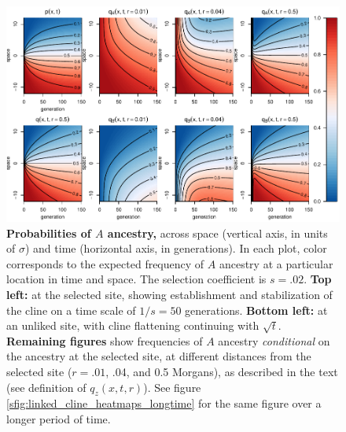 \documentclass[11pt,letterpaper]{article}
\begin{document}
\begin{figure}
    \includegraphics{figs/linked-frequencies.pdf}
    \caption{
        \textbf{Probabilities of $A$ ancestry,}
        across space (vertical axis, in units of $\sigma$) 
        and time (horizontal axis, in generations).
        In each plot, color corresponds to the expected frequency of $A$ ancestry
        at a particular location in time and space.
        The selection coefficient is $s=.02$.
        \textbf{Top left:} at the selected site, showing establishment and stabilization of the cline
        on a time scale of $1/s=50$ generations.
        \textbf{Bottom left:} at an unliked site,
        with cline flattening continuing with $\sqrt{t}$.
        \textbf{Remaining figures} show frequencies of $A$ ancestry \emph{conditional}
        on the ancestry at the selected site,
        at different distances from the selected site ($r=.01$, .04, and 0.5 Morgans),
        as described in the text (see definition of $q_z(x,t,r)$).
        See figure \ref{sfig:linked_cline_heatmaps_longtime}
        for the same figure over a longer period of time.
    }
    \label{fig:linked_cline_heatmaps}
\end{figure}
\end{document}
